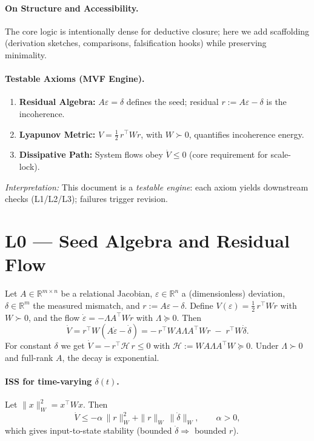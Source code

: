 \documentclass[12pt,a4paper]{article}
\begin{document}
\paragraph{On Structure and Accessibility.}
The core logic is intentionally dense for deductive closure; here we add scaffolding (derivation sketches, comparisons, falsification hooks) while preserving minimality.

\paragraph{Testable Axioms (MVF Engine).}
\begin{enumerate}[label=\textbf{Axiom \Roman*},labelwidth=2.8em,leftmargin=!,align=left] %
\item \textbf{Residual Algebra:} \(A\varepsilon=\delta\) defines the seed; residual \(r:=A\varepsilon-\delta\) is the incoherence.
\item \textbf{Lyapunov Metric:} \(V=\tfrac12\,r^\top W r\), with \(W\succ0\), quantifies incoherence energy.
\item \textbf{Dissipative Path:} System flows obey \(\dot V\le0\) (core requirement for scale-lock).
\end{enumerate}
\textit{Interpretation:} This document is a \emph{testable engine}: each axiom yields downstream checks (L1/L2/L3); failures trigger revision.

\section{L0 --- Seed Algebra and Residual Flow}
Let \(A\in\mathbb{R}^{m\times n}\) be a relational Jacobian, \(\varepsilon\in\mathbb{R}^n\) a (dimensionless) deviation, \(\delta\in\mathbb{R}^m\) the measured mismatch, and \(r:=A\varepsilon-\delta\).
Define \(V(\varepsilon)=\frac12\,r^\top W r\) with \(W\succ0\), and the flow \(\dot\varepsilon=-\Lambda A^\top W r\) with \(\Lambda\succeq0\).
Then
\begin{equation}
\boxed{\dot V = r^\top W(A\dot\varepsilon-\dot\delta) = -\,r^\top W A \Lambda A^\top W r \;-\; r^\top W \dot\delta.}
\end{equation}
For constant \(\delta\) we get \(\dot V= -\,r^\top \mathcal{H}\,r\le 0\) with \(\mathcal{H}:=W A \Lambda A^\top W\succeq0\).
Under \(\Lambda\succ0\) and full-rank \(A\), the decay is exponential.

\paragraph{ISS for time-varying \(\delta(t)\).}
Let \(\|x\|_W^2=x^\top W x\). Then
\begin{equation}\label{eq:ISS}
\boxed{\dot V \le -\alpha\,\|r\|_W^2 + \|r\|_W\,\|\dot\delta\|_W,\qquad \alpha>0,}
\end{equation}
which gives input-to-state stability (bounded \(\dot\delta\Rightarrow\) bounded \(r\)).
\end{document}
